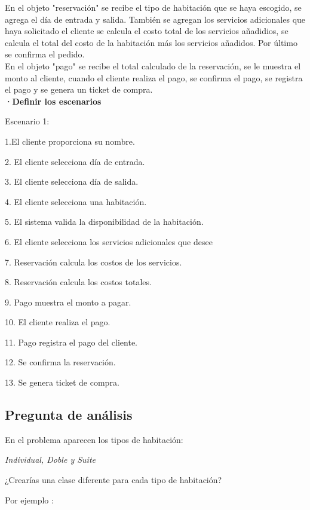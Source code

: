 \documentclass[12pt]{article}
\begin{document}
En el objeto "reservación" se recibe el tipo de habitación que se haya escogido, se agrega el día de entrada y salida. También se agregan los servicios adicionales que haya solicitado el cliente se calcula el costo total de los servicios añadidios, se calcula el total del costo de la habitación más los servicios añadidos. Por último se confirma el pedido. \\

En el objeto "pago" se recibe el total calculado de la reservación, se le muestra el monto al cliente, cuando el cliente realiza el pago, se confirma el pago, se registra el pago y se genera un ticket de compra. \\

\textbf{·Definir los escenarios}

Escenario 1:

1.El cliente proporciona su nombre.

2. El cliente selecciona día de entrada.

3. El cliente selecciona día de salida.

4. El cliente selecciona una habitación.

5. El sistema valida la disponibilidad de la habitación.

6. El cliente selecciona los servicios adicionales que desee

7. Reservación calcula los costos de los servicios.

8. Reservación calcula los costos totales.

9. Pago muestra el monto a pagar.

10. El cliente realiza el pago.

11. Pago registra el pago del cliente.

12. Se confirma la reservación.

13. Se genera ticket de compra.

\subsection*{Pregunta de análisis}

En el problema aparecen los tipos de habitación:

\begin{center}
\textit{Individual, Doble y Suite}
\end{center}

¿Crearías una clase diferente para cada tipo de habitación?

Por ejemplo : \\
\end{document}
